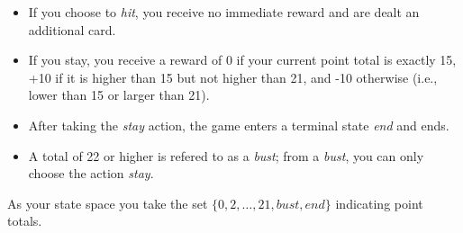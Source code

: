 \documentclass[12pt]{article}
\begin{document}
\begin{itemize}

\item If you choose to {\it hit}, you receive no immediate reward and
  are dealt an additional card.  

\item If you stay, you receive a reward of 0 if your current point
  total is exactly 15, +10 if it is higher than 15 but not higher than
  21, and -10 otherwise (i.e., lower than 15 or larger than 21).

\item After taking the {\it stay} action, the game enters a terminal
  state {\it end} and ends.

\item A total of 22 or higher is refered to as a {\it bust}; from a
  {\it bust}, you can only choose the action {\it stay}.

\end{itemize}

\noindent
As your state space you take the set $\{0,2,\ldots,21,bust,end\}$
indicating point totals.
\end{document}
